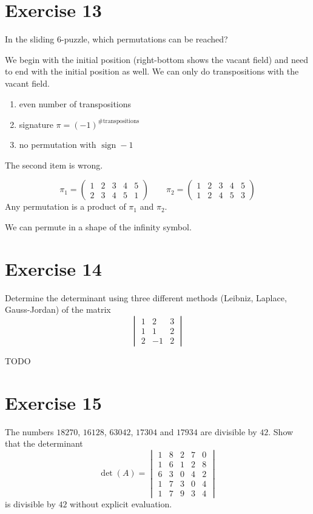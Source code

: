 \documentclass[a4paper]{article}
\theoremstyle{definition}
\DeclareMathOperator\sign{sign}
\begin{document}
\section*{Exercise 13}
\begin{ex}
  In the sliding 6-puzzle, which permutations can be reached?
\end{ex}

We begin with the initial position (right-bottom shows the vacant field) and need to end with the initial position as well.
We can only do transpositions with the vacant field.
\begin{enumerate}
  \item even number of transpositions
  \item signature $\pi = (-1)^{\text{\# transpositions}}$
  \item no permutation with $\sign - 1$
\end{enumerate}

The second item is wrong.

\[
  \pi_1 = \begin{pmatrix} 1 & 2 & 3 & 4 & 5 \\ 2 & 3 & 4 & 5 & 1 \end{pmatrix} \qquad
  \pi_2 = \begin{pmatrix} 1 & 2 & 3 & 4 & 5 \\ 1 & 2 & 4 & 5 & 3 \end{pmatrix}
\]
Any permutation is a product of $\pi_1$ and $\pi_2$.

We can permute in a shape of the infinity symbol.

\section*{Exercise 14}
\begin{ex}
  Determine the determinant using three different methods (Leibniz, Laplace, Gauss-Jordan) of the matrix
  \[
    \begin{vmatrix}
      1 & 2 & 3 \\
      1 & 1 & 2 \\
      2 & -1 & 2
    \end{vmatrix}
  \]
\end{ex}

TODO

\section*{Exercise 15}
\begin{ex}
  The numbers $18270$, $16128$, $63042$, $17304$ and $17934$ are divisible by $42$.
  Show that the determinant
  \[
    \det(A) = \begin{vmatrix}
      1 & 8 & 2 & 7 & 0 \\
      1 & 6 & 1 & 2 & 8 \\
      6 & 3 & 0 & 4 & 2 \\
      1 & 7 & 3 & 0 & 4 \\
      1 & 7 & 9 & 3 & 4
    \end{vmatrix}
  \]
  is divisible by $42$ without explicit evaluation.
\end{ex}
\end{document}
